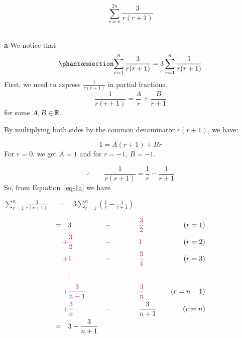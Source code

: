 \documentclass[
  a4paper,
]{report}
\begin{document}
\[\sum_{r = n}^{2n}{\frac{3}{r(r + 1)}}\]\\

\begin{tcolorbox}[enhanced jigsaw, leftrule=.75mm, left=2mm, opacitybacktitle=0.6, breakable, bottomtitle=1mm, colframe=quarto-callout-tip-color-frame, opacityback=0, colbacktitle=quarto-callout-tip-color!10!white, toptitle=1mm, arc=.35mm, titlerule=0mm, coltitle=black, rightrule=.15mm, bottomrule=.15mm, toprule=.15mm, title={Solution}, colback=white]

\textbf{a} We notice that
\begin{equation}\phantomsection\label{eq-1a}{\sum_{r=1}^{n}\frac{3}{r(r+1)}=3\sum_{r=1}^{n}\frac{1}{r(r+1)}}\end{equation}
First, we need to express \(\frac{1}{r(r+1)}\) in partial fractions. \[
\frac{1}{r(r+1)}=\frac{A}{r}+\frac{B}{r+1}\] for some
\(A,B \in \mathbb{R}\).

By multiplying both sides by the common denominator \(r(r+1)\), we have:

\[1=A(r+1)+Br \] For \(r=0\), we get \(A=1\) and for \(r=-1\), \(B=-1\).

\[\therefore \qquad \frac{1}{r(r+1)}=\frac{1}{r}-\frac{1}{r+1} \] So,
from Equation~\ref{eq-1a} we have

\(\sum_{r=1}^{n}\frac{3}{r(r+1)} \ \quad  = \quad 3\sum_{r=1}^{n} \left(\frac{1}{r}-\frac{1}{r+1}\right)\)

\begin{alignat*}{3}
= \quad & 3 & \textcolor{magenta}{-} \qquad & \qquad  \textcolor{magenta}{\frac{3}{2}}  & \quad (r=1) \\
\textcolor{magenta}{+}  & \textcolor{magenta}{\frac{3}{2}}  &\textcolor{magenta}{-} \qquad& \qquad \textcolor{magenta}{ 1} & \quad (r=2) \\
\textcolor{magenta}{+} &\textcolor{magenta}{1} &\textcolor{magenta}{-} \qquad& \qquad  \textcolor{magenta}{\frac{3}{4}} & \quad (r=3) \\
&\textcolor{magenta}{\vdots} & & \quad & \\
\textcolor{magenta}{+}  & \textcolor{magenta}{\frac{3}{n-1}}  &\textcolor{magenta}{-} \qquad& \qquad  \textcolor{magenta}{\frac{3}{n}}  & \quad (r=n-1)\\
\textcolor{magenta}{+} & \textcolor{magenta}{\frac{3}{n}} & - \qquad & \qquad \frac{3}{n+1} & \quad (r=n)\\
= \quad & 3 - \frac{3}{n+1} & & \quad & 
\end{alignat*}


\end{tcolorbox}
\end{document}
